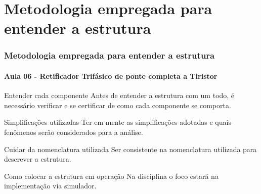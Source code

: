 \documentclass[aspectratio=43]{beamer}
\begin{document}
\section{Metodologia empregada para entender a estrutura}
%
\begin{frame}
	\frametitle{Metodologia empregada para entender a estrutura}
	\framesubtitle{Aula 06 - Retificador Trifásico de ponte completa a Tiristor}
%	
	\begin{block}{Entender cada componente}
	Antes de entender a estrutura com um todo, é necessário verificar e se certificar de como cada componente se comporta.
	\end{block}	
		\begin{block}{Simplificações utilizadas}
			Ter em mente as simplificações adotadas e quais fenômenos serão considerados para a análise.
		\end{block}	
		
		\begin{block}{Cuidar da nomenclatura utilizada}
			Ser consistente na nomenclatura utilizada para descrever a estrutura.
		\end{block}	
		\begin{block}{Como colocar a estrutura em operação}
			Na disciplina o foco estará na implementação via simulador.
		\end{block}			
%
\end{frame}
%





	
	



%



\end{document}
